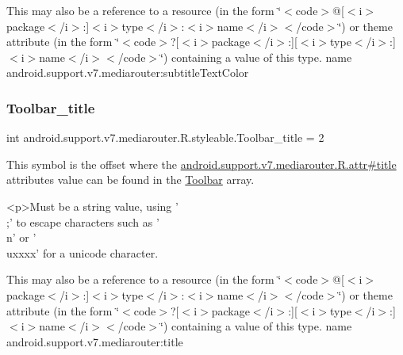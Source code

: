 This may also be a reference to a resource (in the form \char`\"{}$<$code$>$@\mbox{[}$<$i$>$package$<$/i$>$\+:\mbox{]}$<$i$>$type$<$/i$>$\+:$<$i$>$name$<$/i$>$$<$/code$>$\char`\"{}) or theme attribute (in the form \char`\"{}$<$code$>$?\mbox{[}$<$i$>$package$<$/i$>$\+:\mbox{]}\mbox{[}$<$i$>$type$<$/i$>$\+:\mbox{]}$<$i$>$name$<$/i$>$$<$/code$>$\char`\"{}) containing a value of this type.  name android.\+support.\+v7.\+mediarouter\+:subtitle\+Text\+Color \mbox{\label{classandroid_1_1support_1_1v7_1_1mediarouter_1_1R_1_1styleable_a05ec1e28754fbfa9f733ca3620654664}} 
\subsubsection{\texorpdfstring{Toolbar\+\_\+title}{Toolbar\_title}}
{\footnotesize\ttfamily int android.\+support.\+v7.\+mediarouter.\+R.\+styleable.\+Toolbar\+\_\+title = 2\hspace{0.3cm}{\ttfamily [static]}}

This symbol is the offset where the \hyperlink{classandroid_1_1support_1_1v7_1_1mediarouter_1_1R_1_1attr_a63e7cf1dd1a79d708a4d99098363d8bd}{android.\+support.\+v7.\+mediarouter.\+R.\+attr\#title} attribute\textquotesingle{}s value can be found in the \hyperlink{classandroid_1_1support_1_1v7_1_1mediarouter_1_1R_1_1styleable_a6815cdfaadde30c82b955863af196899}{Toolbar} array.

\begin{DoxyVerb}      <p>Must be a string value, using '\\;' to escape characters such as '\\n' or '\\uxxxx' for a unicode character.
\end{DoxyVerb}
 

This may also be a reference to a resource (in the form \char`\"{}$<$code$>$@\mbox{[}$<$i$>$package$<$/i$>$\+:\mbox{]}$<$i$>$type$<$/i$>$\+:$<$i$>$name$<$/i$>$$<$/code$>$\char`\"{}) or theme attribute (in the form \char`\"{}$<$code$>$?\mbox{[}$<$i$>$package$<$/i$>$\+:\mbox{]}\mbox{[}$<$i$>$type$<$/i$>$\+:\mbox{]}$<$i$>$name$<$/i$>$$<$/code$>$\char`\"{}) containing a value of this type.  name android.\+support.\+v7.\+mediarouter\+:title \mbox{\label{classandroid_1_1support_1_1v7_1_1mediarouter_1_1R_1_1styleable_a1f5dbc575e0bcf37c09dd7506d9b2bcc}} 
